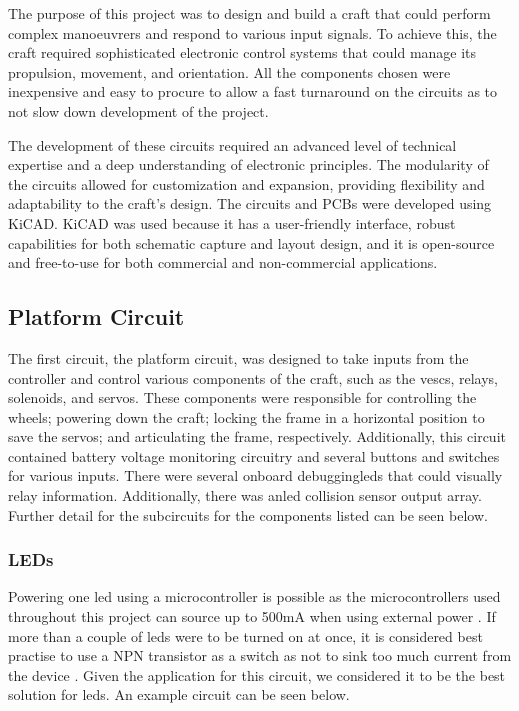 \documentclass [12pt]{article}
\begin{document}
The purpose of this project was to design and build a craft that could perform complex manoeuvrers and respond to various input signals. To achieve this, the craft required sophisticated electronic control systems that could manage its propulsion, movement, and orientation. All the components chosen were inexpensive and easy to procure to allow a fast turnaround on the circuits as to not slow down development of the project.

The development of these circuits required an advanced level of technical expertise and a deep understanding of electronic principles. The modularity of the circuits allowed for customization and expansion, providing flexibility and adaptability to the craft's design. The circuits and PCBs were developed using KiCAD. KiCAD was used because it has a user-friendly interface, robust capabilities for both schematic capture and layout design, and it is open-source and free-to-use for both commercial and non-commercial applications.

\subsection{Platform Circuit}
The first circuit, the platform circuit, was designed to take inputs from the controller and control various components of the craft, such as the \gls{vesc}s, relays, solenoids, and servos. These components were responsible for controlling the wheels; powering down the craft; locking the frame in a horizontal position to save the servos; and articulating the frame, respectively. Additionally, this circuit contained battery voltage monitoring circuitry and several buttons and switches for various inputs. There were several onboard debugging\gls{led}s that could visually relay information. Additionally, there was an\gls{led} collision sensor output array. Further detail for the subcircuits for the components listed can be seen below.

\subsubsection{LEDs}\label{sec:LEDS}

Powering one \gls{led} using a microcontroller is possible as the microcontrollers used throughout this project can source up to 500mA when using external power \cite{nucleo144}. If more than a couple of \gls{led}s were to be turned on at once, it is considered best practise to use a NPN transistor as a switch as not to sink too much current from the device \cite{artofe}. Given the application for this circuit, we considered it to be the best solution for \gls{led}s. An example circuit can be seen below.
\end{document}
